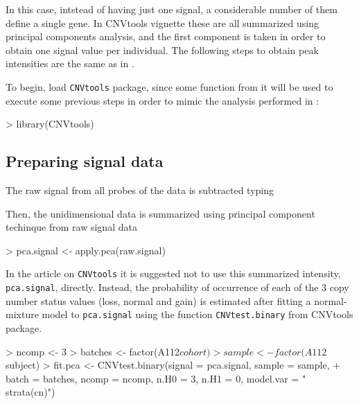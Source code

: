 \documentclass[11pt]{article}
\begin{document}
\normalsize



In this case, intstead of having just one signal, a considerable number of them define a single gene.
In CNVtools vignette \cite{CNVtools-vignette} these are all summarized using principal components analysis, and the first component
is taken in order to obtain one signal value per individual.
The following steps to obtain peak intensities are the same as in \cite{CNVtools-vignette}.

To begin, load \texttt{CNVtools} package, since some function from it will be used to execute some previous steps in order to mimic the 
analysis performed in \cite{CNVtools-vignette}:
\begin{Schunk}
\begin{Sinput}
> library(CNVtools)
\end{Sinput}
\end{Schunk}



\subsection{Preparing signal data}

The raw signal from all probes of the data is subtracted typing
\begin{Schunk}
\end{Schunk}

Then, the unidimensional data is summarized using principal component techinque from raw signal data
\begin{Schunk}
\begin{Sinput}
> pca.signal <- apply.pca(raw.signal)
\end{Sinput}
\end{Schunk}

In the article on \texttt{CNVtools} \cite{CNVtools} it is suggested not to use this summarized intensity, \texttt{pca.signal}, directly. Instead, the probability of occurrence of each of the 3 copy number status values (loss, normal and gain) is estimated after fitting a normal-mixture model to
\texttt{pca.signal} using the function \texttt{CNVtest.binary} from CNVtools package.
\begin{Schunk}
\begin{Sinput}
> ncomp <- 3
> batches <- factor(A112$cohort)
> sample <- factor(A112$subject)
> fit.pca <- CNVtest.binary(signal = pca.signal, sample = sample, 
+ batch = batches, ncomp = ncomp, n.H0 = 3, n.H1 = 0, model.var = "~ strata(cn)")
\end{Sinput}
\end{Schunk}
\end{document}
